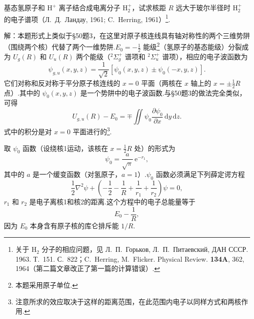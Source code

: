 \begin{xiti}

基态氢原子和 $\mathrm{H}^+$ 离子结合成电离分子 $\mathrm{H}_2^+$，试求核距 $R$ 远大于玻尔半径时 $\mathrm{H}_2^+$ 的电子谱项（Л.~Д.~Ландау, 1961; C.~Herring, 1961）\footnote{关于 $\mathrm{H}_2$ 分子的相应问题，见 Л.~П.~Горьков, Л.~П.~Питаевский, ДАН СССР. 1963. Т.~151. С.~822；C.~Herring, M.~Flicker. Physical Review. \textbf{134A}, 362, 1964（第二篇文章改正了第一篇的计算错误）.}.

解：本题形式上类似于§50题3，在这里对原子核连线具有轴对称性的两个三维势阱（围绕两个核）代替了两个一维势阱.$E_0=-\frac{1}{2}$ 能级\footnote{本题采用原子单位.}（氢原子的基态能级）分裂成为 $U_g(R)$ 和 $U_u(R)$ 两个能级（$^2\Sigma_g^+$ 谱项和 $^2\Sigma_u^+$ 谱项），相应的电子波函数为
\begin{equation*}
  \psi_{g,u}(x,y,z)=\frac{1}{\sqrt{2}}\left[\psi_0(x,y,z)\pm\psi_0(-x,y,z)\right].
\end{equation*}
它们对称和反对称于平分原子核连线的 $x=0$ 平面（两核在 $x$ 轴上的 $x=\pm\frac{1}{2}R$ 点）.其中的 $\psi_0(x,y,z)$ 是一个势阱中的电子波函数.与§50题3的做法完全类似，可得
\setcounter{equation}{0}\renewcommand{\theequation}{\arabic{equation}}%
\begin{equation}
  U_{g,u}(R)-E_0=\mp\iint\psi_0\frac{\partial\psi_0}{\partial x}\,\mathrm{d}y\,\mathrm{d}z.
\end{equation}
式中的积分是对 $x=0$ 平面进行的\footnote{注意所求的效应取决于这样的距离范围，在此范围内电子以同样方式和两核作用.}.

取 $\psi_0$ 函数（设绕核1运动，该核在 $x=\frac{1}{2}R$ 处）的形式为
\begin{equation}
  \psi_0=\frac{a}{\sqrt{\pi}}\,\mathrm{e}^{-r_1},
\end{equation}
其中的 $a$ 是一个缓变函数（对氢原子，$a=1$）.$\psi_0$ 函数必须满足下列薛定谔方程
\begin{equation}
  \frac{1}{2}\nabla^2\psi+\left(-\frac{1}{2}-\frac{1}{R}
  +\frac{1}{r_1}+\frac{1}{r_2}\right)\psi=0,
\end{equation}
$r_1$ 和 $r_2$ 是电子离核1和核2的距离.这个方程中的电子总能量等于
\begin{equation*}
  E_0-\frac{1}{R},
\end{equation*}
因为 $E_0$ 本身含有原子核的库仑排斥能 $1/R$.


\end{xiti}
